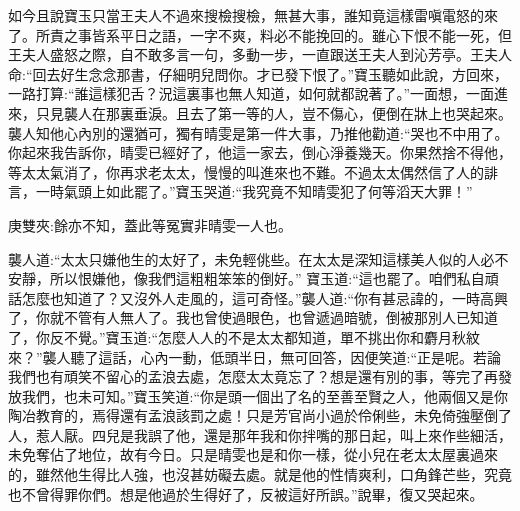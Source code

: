 \begin{parag}
    如今且說寶玉只當王夫人不過來搜檢搜檢，無甚大事，誰知竟這樣雷嗔電怒的來了。所責之事皆系平日之語，一字不爽，料必不能挽回的。雖心下恨不能一死，但王夫人盛怒之際，自不敢多言一句，多動一步，一直跟送王夫人到沁芳亭。王夫人命:“回去好生念念那書，仔細明兒問你。才已發下恨了。”寶玉聽如此說，方回來，一路打算:“誰這樣犯舌？況這裏事也無人知道，如何就都說著了。”一面想，一面進來，只見襲人在那裏垂淚。且去了第一等的人，豈不傷心，便倒在牀上也哭起來。襲人知他心內別的還猶可，獨有晴雯是第一件大事，乃推他勸道:“哭也不中用了。你起來我告訴你，晴雯已經好了，他這一家去，倒心淨養幾天。你果然捨不得他，等太太氣消了，你再求老太太，慢慢的叫進來也不難。不過太太偶然信了人的誹言，一時氣頭上如此罷了。”寶玉哭道:“我究竟不知晴雯犯了何等滔天大罪！”\begin{note}庚雙夾:餘亦不知，蓋此等冤實非晴雯一人也。\end{note}襲人道:“太太只嫌他生的太好了，未免輕佻些。在太太是深知這樣美人似的人必不安靜，所以恨嫌他，像我們這粗粗笨笨的倒好。” 寶玉道:“這也罷了。咱們私自頑話怎麼也知道了？又沒外人走風的，這可奇怪。”襲人道:“你有甚忌諱的，一時高興了，你就不管有人無人了。我也曾使過眼色，也曾遞過暗號，倒被那別人已知道了，你反不覺。”寶玉道:“怎麼人人的不是太太都知道，單不挑出你和麝月秋紋來？”襲人聽了這話，心內一動，低頭半日，無可回答，因便笑道:“正是呢。若論我們也有頑笑不留心的孟浪去處，怎麼太太竟忘了？想是還有別的事，等完了再發放我們，也未可知。”寶玉笑道:“你是頭一個出了名的至善至賢之人，他兩個又是你陶冶教育的，焉得還有孟浪該罰之處！只是芳官尚小過於伶俐些，未免倚強壓倒了人，惹人厭。四兒是我誤了他，還是那年我和你拌嘴的那日起，叫上來作些細活，未免奪佔了地位，故有今日。只是晴雯也是和你一樣，從小兒在老太太屋裏過來的，雖然他生得比人強，也沒甚妨礙去處。就是他的性情爽利，口角鋒芒些，究竟也不曾得罪你們。想是他過於生得好了，反被這好所誤。”說畢，復又哭起來。
\end{parag}


